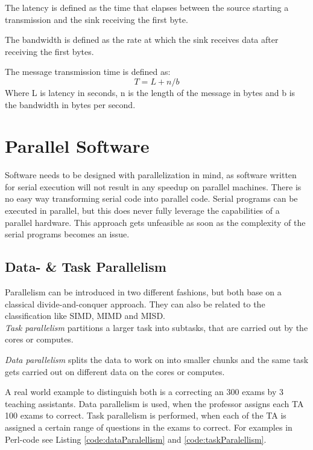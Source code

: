 \documentclass{article}
\begin{document}
	The latency is defined as the time that elapses between the source starting a transmission
	and the sink receiving the first byte.
	
	The bandwidth is defined as the rate at which the sink receives data after receiving the first bytes.

	The message transmission time is defined as:\\
		$$ T = L + n/b$$
	Where L is latency in seconds,
	n is the length of the message in bytes
	and b is the bandwidth in bytes per second.

\section{Parallel Software} %
\label{sec:parallel_software}
Software needs to be designed with parallelization in mind,
as software written for serial execution will not result in any speedup on parallel machines.
There is no easy way transforming serial code into parallel code.
Serial programs can be executed in parallel,
but this does never fully leverage the capabilities of a parallel hardware.
This approach gets unfeasible as soon as the complexity of the serial programs becomes an issue.

\subsection{Data- \& Task Parallelism} %
\label{sub:data_task_parallelism}
	Parallelism can be introduced in two different fashions,
	but both base on a classical divide-and-conquer approach.
	They can also be related to the classification like SIMD, MIMD and MISD.\\
	\textsl{Task parallelism} partitions a larger task into subtasks,
	that are carried out by the cores or computes.

	\textsl{Data parallelism} splits the data to work on into smaller chunks
	and the same task gets carried out on different data on the cores or computes.

	A real world example to distinguish both is a correcting an 300 exams by 3 teaching assistants.
	Data parallelism is used,
	when the professor assigns each TA 100 exams to correct.
	Task parallelism is performed,
	when each of the TA is assigned a certain range of questions in the exams to correct.
	For examples in Perl-code see Listing \ref{code:dataParalellism} and \ref{code:taskParalellism}.
\end{document}
